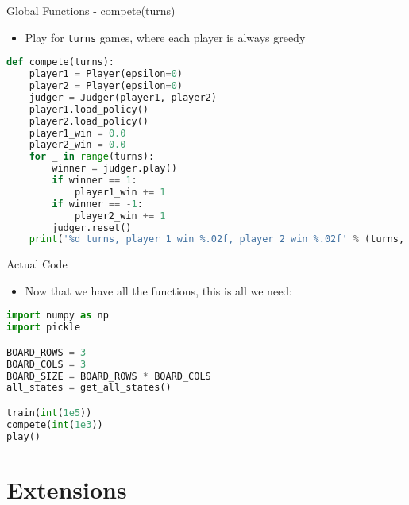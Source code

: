 \documentclass{beamer}
\begin{document}
\begin{frame}[fragile]{Global Functions - compete(turns)}
\begin{itemize}
	\item Play for \texttt{turns} games, where each player is always greedy
\end{itemize}
\begin{lstlisting}[language=Python]
def compete(turns):
    player1 = Player(epsilon=0)
    player2 = Player(epsilon=0)
    judger = Judger(player1, player2)
    player1.load_policy()
    player2.load_policy()
    player1_win = 0.0
    player2_win = 0.0
    for _ in range(turns):
        winner = judger.play()
        if winner == 1:
            player1_win += 1
        if winner == -1:
            player2_win += 1
        judger.reset()
    print('%d turns, player 1 win %.02f, player 2 win %.02f' % (turns, player1_win / turns, player2_win / turns))
\end{lstlisting}
\end{frame}
\begin{frame}[fragile]{Actual Code}
	\begin{itemize}
		\item Now that we have all the functions, this is all we need:
	\end{itemize}
\begin{lstlisting}[language=Python]
import numpy as np
import pickle

BOARD_ROWS = 3
BOARD_COLS = 3
BOARD_SIZE = BOARD_ROWS * BOARD_COLS
all_states = get_all_states()

train(int(1e5))
compete(int(1e3))
play()
\end{lstlisting}
\end{frame}
  
  
  
\section{Extensions}
  
\end{document}
